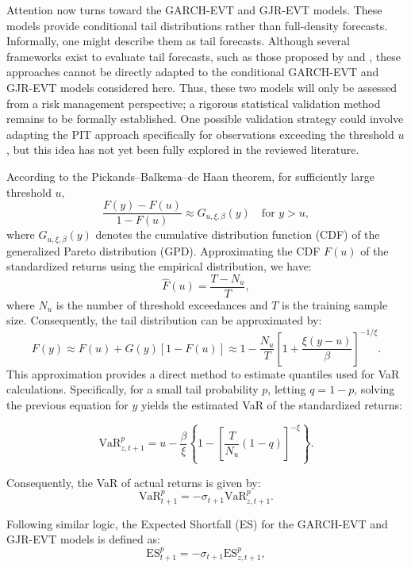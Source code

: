 Attention now turns toward the GARCH-EVT and GJR-EVT models. These models provide conditional tail distributions rather than full-density forecasts. Informally, one might describe them as tail forecasts. Although several frameworks exist to evaluate tail forecasts, such as those proposed by  and , these approaches cannot be directly adapted to the conditional GARCH-EVT and GJR-EVT models considered here. Thus, these two models will only be assessed from a risk management perspective; a rigorous statistical validation method remains to be formally established. One possible validation strategy could involve adapting the PIT approach specifically for observations exceeding the threshold $u$, but this idea has not yet been fully explored in the reviewed literature.

According to the Pickands–Balkema–de Haan theorem, for sufficiently large threshold $u$,
\[
\frac{F(y) - F(u)}{1 - F(u)} \approx G_{u, \xi,\beta}(y) \quad \text{for } y>u,
\]
\newpage
where $G_{u, \xi, \beta}(y)$ denotes the cumulative distribution function (CDF) of the generalized Pareto distribution (GPD). Approximating the CDF $F(u)$ of the standardized returns using the empirical distribution, we have:
\[
\hat{F}(u) = \frac{T - N_{u}}{T},
\]
where $N_u$ is the number of threshold exceedances and $T$ is the training sample size. Consequently, the tail distribution can be approximated by:
\[
F(y) \approx  F(u) + G(y)[1 - F(u)] \approx 1 - \frac{N_{u}}{T} \left[ 1 + \frac{\xi(y - u)}{\beta} \right]^{-1/\xi}.
\]
This approximation provides a direct method to estimate quantiles used for VaR calculations. Specifically, for a small tail probability $p$, letting $q = 1 - p$, solving the previous equation for $y$ yields the estimated VaR of the standardized returns:

\begin{equation}
    \text{VaR}_{z,t+1}^{p} =  u - \frac{\beta}{\xi} \left\{ 1 - \left[ \frac{T}{N_{u}} (1 - q) \right]^{-\xi} \right\}.
    \label{eq:4.8}
\end{equation}

Consequently, the VaR of actual returns is given by:
\begin{equation}
    \text{VaR}_{t+1}^{p} =  -\sigma_{t+1}\text{VaR}_{z,t+1}^{p}.
    \label{eq:4.9}
\end{equation}

Following similar logic, the Expected Shortfall (ES) for the GARCH-EVT and GJR-EVT models is defined as:
\begin{equation}
    \text{ES}_{t+1}^{p} =  -\sigma_{t+1}\text{ES}_{z,t+1}^{p},
    \label{eq:4.10}
\end{equation}

